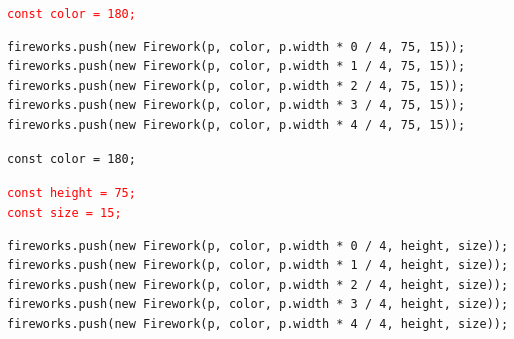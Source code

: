 \documentclass{article}
\begin{document}
    \vspace{0.2cm}
    \begin{tcolorbox}[colback=gray!30, colframe=white]
        \texttt{\textcolor{red}{const color = 180;}} \\
        \vspace{-0.4cm}
        \begin{verbatim}
fireworks.push(new Firework(p, color, p.width * 0 / 4, 75, 15));
fireworks.push(new Firework(p, color, p.width * 1 / 4, 75, 15));
fireworks.push(new Firework(p, color, p.width * 2 / 4, 75, 15));
fireworks.push(new Firework(p, color, p.width * 3 / 4, 75, 15));
fireworks.push(new Firework(p, color, p.width * 4 / 4, 75, 15));\end{verbatim}
    \end{tcolorbox}
    \vspace{0.2cm}


    \vspace{0.2cm}
    \begin{tcolorbox}[colback=gray!30, colframe=white]
        \begin{verbatim}
const color = 180;\end{verbatim}
        \vspace{-0.4cm}
        \texttt{\textcolor{red}{const height = 75;}} \\
        \texttt{\textcolor{red}{const size = 15;}} \\
        \vspace{-0.4cm}
        \begin{verbatim}
fireworks.push(new Firework(p, color, p.width * 0 / 4, height, size));
fireworks.push(new Firework(p, color, p.width * 1 / 4, height, size));
fireworks.push(new Firework(p, color, p.width * 2 / 4, height, size));
fireworks.push(new Firework(p, color, p.width * 3 / 4, height, size));
fireworks.push(new Firework(p, color, p.width * 4 / 4, height, size));\end{verbatim}
    \end{tcolorbox}

    \vspace{0.2cm}

    
\end{document}
